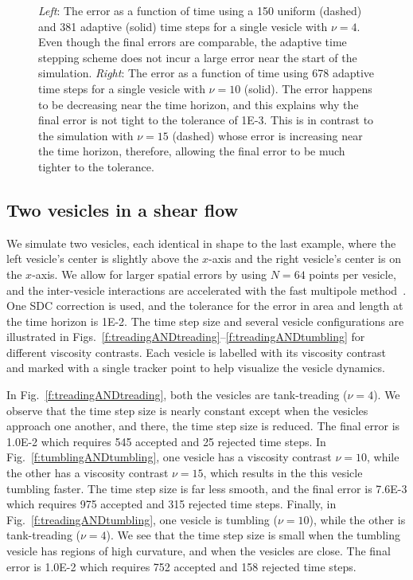 \documentclass[3p,times,procedia]{elsarticle}
\newif\ifTikz
\begin{document}
\begin{figure}[htps]
\centering
\begin{minipage}{.48\textwidth}
\ifTikz

\fi
\end{minipage}
\begin{minipage}{.48\textwidth}
\ifTikz

\fi
\end{minipage}
\caption{\label{f:shear1VesErrors} {\em Left}: The error as a function
of time using a 150 uniform (dashed) and 381 adaptive (solid) time
steps for a single vesicle with $\nu=4$.  Even though the final errors
are comparable, the adaptive time stepping scheme does not incur a
large error near the start of the simulation.  {\em Right}: The error
as a function of time using 678 adaptive time steps for a single
vesicle with $\nu=10$ (solid).  The error happens to be decreasing near
the time horizon, and this explains why the final error is not tight to
the tolerance of 1E-3.  This is in contrast to the simulation with
$\nu=15$ (dashed) whose error is increasing near the time horizon,
therefore, allowing the final error to be much tighter to the
tolerance.} 
\end{figure}

\subsection{Two vesicles in a shear flow}
We simulate two vesicles, each identical in shape to the last example,
where the left vesicle's center is slightly above the $x$-axis and the
right vesicle's center is on the $x$-axis.  We allow for larger spatial
errors by using $N=64$ points per vesicle, and the inter-vesicle
interactions are accelerated with the fast multipole
method~\cite{gre:rok1987}.  One SDC correction is used, and the
tolerance for the error in area and length at the time horizon is 1E-2.
The time step size and several vesicle configurations are illustrated in
Figs.~\ref{f:treadingANDtreading}--\ref{f:treadingANDtumbling} for
different viscosity contrasts.  Each vesicle is labelled with its
viscosity contrast and marked with a single tracker point to help
visualize the vesicle dynamics.

In Fig.~\ref{f:treadingANDtreading}, both the vesicles are tank-treading
($\nu=4$).  We observe that the time step size is nearly constant except
when the vesicles approach one another, and there, the time step size is
reduced.  The final error is 1.0E-2 which requires 545 accepted and 25
rejected time steps.  In Fig.~\ref{f:tumblingANDtumbling}, one vesicle
has a viscosity contrast $\nu=10$, while the other has a viscosity
contrast $\nu=15$, which results in the this vesicle tumbling faster.
The time step size is far less smooth, and the final error is 7.6E-3
which requires 975 accepted and 315 rejected time steps.  Finally, in
Fig.~\ref{f:treadingANDtumbling}, one vesicle is tumbling ($\nu = 10$),
while the other is tank-treading ($\nu = 4$).  We see that the time step
size is small when the tumbling vesicle has regions of high curvature,
and when the vesicles are close.  The final error is 1.0E-2 which
requires 752 accepted and 158 rejected time steps.
\end{document}
